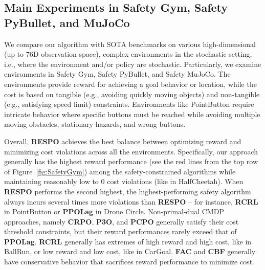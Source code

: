 \documentclass{article}
\theoremstyle{definition}
\begin{document}
\subsection{Main Experiments in Safety Gym, Safety PyBullet, and MuJoCo}
\label{section:SGE}
We compare our algorithm with SOTA benchmarks on various high-dimensional (up to $76$D observation space), complex environments in the stochastic setting, i.e., where the environment and/or policy are stochastic. Particularly, we examine environments in Safety Gym, Safety PyBullet, and Safety MuJoCo. The environments provide reward for achieving a goal behavior or location, while the cost is based on tangible (e.g., avoiding quickly moving objects) and non-tangible (e.g., satisfying speed limit) constraints. Environments like PointButton require intricate behavior where specific buttons must be reached while avoiding multiple moving obstacles, stationary hazards, and wrong buttons.

Overall, \textbf{RESPO} achieves the best balance between optimizing reward and minimizing cost violations across all the environments. Specifically, our approach generally has the highest reward performance (see the red lines from the top row of Figure~\ref{fig:SafetyGym}) among the safety-constrained algorithms while maintaining reasonably low to $0$ cost violations (like in HalfCheetah). When \textbf{RESPO} performs the second highest, the highest-performing safety algorithm always incurs several times more violations than \textbf{RESPO} -- for instance, \textbf{RCRL} in PointButton or \textbf{PPOLag} in Drone Circle. Non-primal-dual CMDP approaches, namely \textbf{CRPO}, \textbf{P3O}, and \textbf{PCPO} generally satisfy their cost threshold constraints, but their reward performances rarely exceed that of \textbf{PPOLag}. \textbf{RCRL} generally has extremes of high reward and high cost, like in BallRun, or low reward and low cost, like in CarGoal. \textbf{FAC} and \textbf{CBF} generally have conservative behavior that sacrifices reward performance to minimize cost. 
\end{document}
